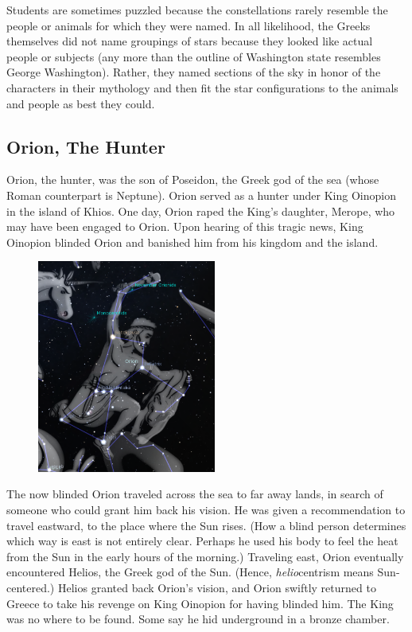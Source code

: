 \documentclass{article}
\numberwithin{equation}{section}
\numberwithin{figure}{section}
\begin{document}
\vspace{1ex}

Students are sometimes puzzled because the constellations rarely resemble the people or animals for which they were named. In all likelihood, the Greeks themselves did not name groupings of stars because they looked like actual people or subjects (any more than the outline of Washington state resembles George Washington). Rather, they named sections of the sky in honor of the characters in their mythology and then fit the star configurations to the animals and people as best they could.

\subsection{Orion, The Hunter}
Orion, the hunter, was the son of Poseidon, the Greek god of the sea (whose Roman counterpart is Neptune). Orion served as a hunter under King Oinopion in the island of Khios. One day, Orion raped the King's daughter, Merope, who may have been engaged to Orion. Upon hearing of this tragic news, King Oinopion blinded Orion and banished him from his kingdom and the island. 

\begin{figure}[h!]
    \centering
    \includegraphics[height=7cm]{Figures/OrionArt.png}
\end{figure}

The now blinded Orion traveled across the sea to far away lands, in search of someone who could grant him back his vision. He was given a recommendation to travel eastward, to the place where the Sun rises. (How a blind person determines which way is east is not entirely clear. Perhaps he used his body to feel the heat from the Sun in the early hours of the morning.) Traveling east, Orion eventually encountered Helios, the Greek god of the Sun. (Hence, \textit{helio}centrism means Sun-centered.) Helios granted back Orion's vision, and Orion swiftly returned to Greece to take his revenge on King Oinopion for having blinded him. The King was no where to be found. Some say he hid underground in a bronze chamber. 
\end{document}
